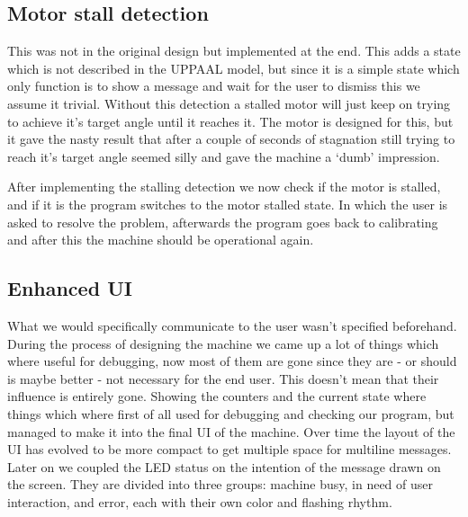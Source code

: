 \subsection{Motor stall detection}
This was not in the original design but implemented at the end. This adds a state which is not described in the UPPAAL model, but since it is a simple state which only function is to show a message and wait for the user to dismiss this we assume it trivial. Without this detection a stalled motor will just keep on trying to achieve it's target angle until it reaches it. The motor is designed for this, but it gave the nasty result that after a couple of seconds of stagnation still trying to reach it's target angle seemed silly and gave the machine a `dumb' impression.

After implementing the stalling detection we now check if the motor is stalled, and if it is the program switches to the motor stalled state. In which the user is asked to resolve the problem, afterwards the program goes back to calibrating and after this the machine should be operational again.

\subsection{Enhanced UI}
What we would specifically communicate to the user wasn't specified beforehand. During the process of designing the machine we came up a lot of things which where useful for debugging, now most of them are gone since they are - or should is maybe better - not necessary for the end user. This doesn't mean that their influence is entirely gone. Showing the counters and the current state where things which where first of all used for debugging and checking our program, but managed to make it into the final UI of the machine. Over time the layout of the UI has evolved to be more compact to get multiple space for multiline messages. Later on we coupled the LED status on the intention of the message drawn on the screen. They are divided into three groups: machine busy, in need of user interaction, and error, each with their own color and flashing rhythm.